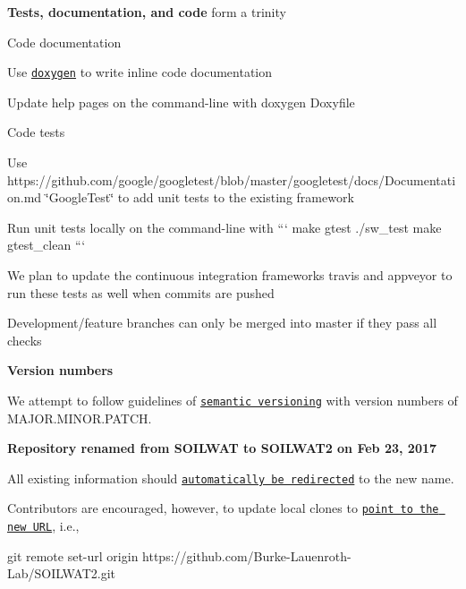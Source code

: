 {\bfseries Tests, documentation, and code} form a trinity
\begin{DoxyItemize}
\item Code documentation
\begin{DoxyItemize}
\item Use \href{http://www.stack.nl/~dimitri/doxygen/}{\tt doxygen} to write inline code documentation
\item Update help pages on the command-\/line with {\ttfamily doxygen Doxyfile}
\end{DoxyItemize}
\item Code tests
\begin{DoxyItemize}
\item Use https\+://github.com/google/googletest/blob/master/googletest/docs/\+Documentation.\+md \char`\"{}\+Google\+Test\char`\"{} to add unit tests to the existing framework
\item Run unit tests locally on the command-\/line with ``` make gtest ./sw\+\_\+test make gtest\+\_\+clean ```
\item We plan to update the continuous integration frameworks \textquotesingle{}travis\textquotesingle{} and \textquotesingle{}appveyor\textquotesingle{} to run these tests as well when commits are pushed
\item Development/feature branches can only be merged into master if they pass all checks
\end{DoxyItemize}
\end{DoxyItemize}

{\bfseries Version numbers}

We attempt to follow guidelines of \href{http://semver.org/}{\tt semantic versioning} with version numbers of M\+A\+J\+O\+R.\+M\+I\+N\+O\+R.\+P\+A\+T\+CH.

{\bfseries Repository renamed from S\+O\+I\+L\+W\+AT to S\+O\+I\+L\+W\+A\+T2 on Feb 23, 2017}

All existing information should \href{https://help.github.com/articles/renaming-a-repository/}{\tt automatically be redirected} to the new name.

Contributors are encouraged, however, to update local clones to \href{https://help.github.com/articles/changing-a-remote-s-url/}{\tt point to the new U\+RL}, i.\+e., 
\begin{DoxyCode}
git remote set-url origin https://github.com/Burke-Lauenroth-Lab/SOILWAT2.git
\end{DoxyCode}
 